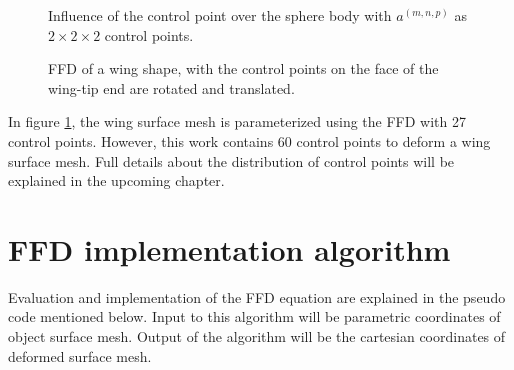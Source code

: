 \begin{figure}
\parbox{0.49\linewidth}
{
\centering
 \caption{Influence of the control point over the sphere body with $a^{(m,n,p)}$ as $2 \times 2 \times 2$ control points.}
 \label{sphere_ffd}
}
\parbox{0.47\linewidth}
{
\centering
  \caption{FFD of a wing shape, with the control points on the face of the wing-tip end are rotated and translated.}
  \label{wing_ffd}
}
\end{figure}

In figure \ref{wing_ffd}, the wing surface mesh is parameterized using the FFD with 27 control points. However, this work contains 60 control points to deform a wing surface mesh. Full details about the distribution of control points will be explained in the upcoming chapter.

\section{FFD implementation algorithm}
Evaluation and implementation of the FFD equation are explained in the pseudo code mentioned below. Input to this algorithm will be parametric coordinates of object surface mesh. Output of the algorithm will be the cartesian coordinates of deformed surface mesh.


